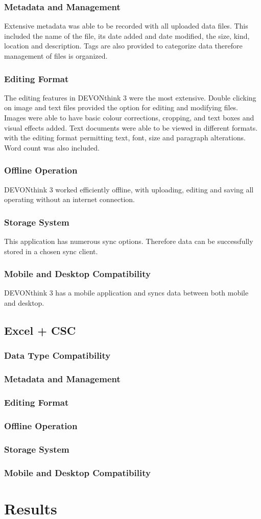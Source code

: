 \documentclass{article}
\begin{document}
\subsubsection{Metadata and Management}
Extensive metadata was able to be recorded with all uploaded data files. This included the name of the file, its date added and date modified, the size, kind, location and description. Tags are also provided to categorize data therefore management of files is organized. 
\subsubsection{Editing Format}
The editing features in DEVONthink 3 were the most extensive. Double clicking on image and text files provided the option for editing and modifying files. Images were able to have basic colour corrections, cropping, and text boxes and visual effects added. Text documents were able to be viewed in different formats. with the editing format permitting text, font, size and paragraph alterations. Word count was also included.
\subsubsection{Offline Operation}
DEVONthink 3 worked efficiently offline, with uploading, editing and saving all operating without an internet connection.
\subsubsection{Storage System}
This application has numerous sync options. Therefore data can be successfully stored in a chosen sync client. 
\subsubsection{Mobile and Desktop Compatibility}
DEVONthink 3 has a mobile application and syncs data between both mobile and desktop.

\subsection{Excel + CSC}
\subsubsection{Data Type Compatibility}
\subsubsection{Metadata and Management}
\subsubsection{Editing Format}
\subsubsection{Offline Operation}
\subsubsection{Storage System}
\subsubsection{Mobile and Desktop Compatibility}

\section{Results}
\end{document}
